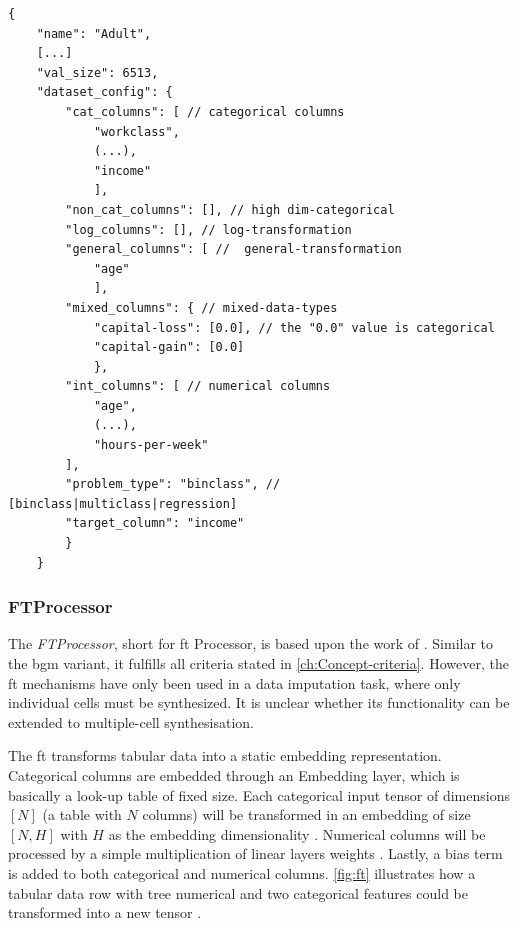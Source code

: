 \begin{lstlisting}[label={lst:info_extended},caption={Example extended data info file from the adult dataset (\autoref{ch:methods-datasets})}]
    {
    "name": "Adult",
    [...]
    "val_size": 6513,
    "dataset_config": {
        "cat_columns": [ // categorical columns
            "workclass", 
            (...), 
            "income"
            ],
        "non_cat_columns": [], // high dim-categorical
        "log_columns": [], // log-transformation
        "general_columns": [ //  general-transformation
            "age"
            ], 
        "mixed_columns": { // mixed-data-types
            "capital-loss": [0.0], // the "0.0" value is categorical           
            "capital-gain": [0.0]
            },
        "int_columns": [ // numerical columns 
            "age", 
            (...), 
            "hours-per-week"
        ],
        "problem_type": "binclass", // [binclass|multiclass|regression]
        "target_column": "income"
        }
    }
\end{lstlisting}

\subsubsection{FTProcessor}
\label{ch:FTProcessor}

The \textit{FTProcessor}, short for \gls{ft} Processor, is based upon the work of \cite{zheng2022DiffusionModelsMissing, gorishniy2021RevisitingDeepLearning}.
Similar to the \gls{bgm} variant, it fulfills all criteria stated in \autoref{ch:Concept-criteria}.
However, the \gls{ft} mechanisms have only been used in a data imputation task, where only individual cells must be synthesized.
It is unclear whether its functionality can be extended to multiple-cell synthesisation.

The \gls{ft} transforms tabular data into a static embedding representation.
Categorical columns are embedded through an Embedding layer, which is basically a look-up table \cite{EmbeddingPyTorch13} of fixed size.
Each categorical input tensor of dimensions $[N]$ (\ie a table with $N$ columns) will be transformed in an embedding of size $[N,H]$ with $H$ as the embedding dimensionality \cite{gorishniy2021RevisitingDeepLearning}.
Numerical columns will be processed by a simple multiplication of linear layers weights \cite{gorishniy2021RevisitingDeepLearning}.
Lastly, a bias term is added to both categorical and numerical columns.
\autoref{fig:ft} illustrates how a tabular data row with tree numerical and two categorical features could be transformed into a new tensor \cite[Figure 2a, p.4]{gorishniy2021RevisitingDeepLearning}.

